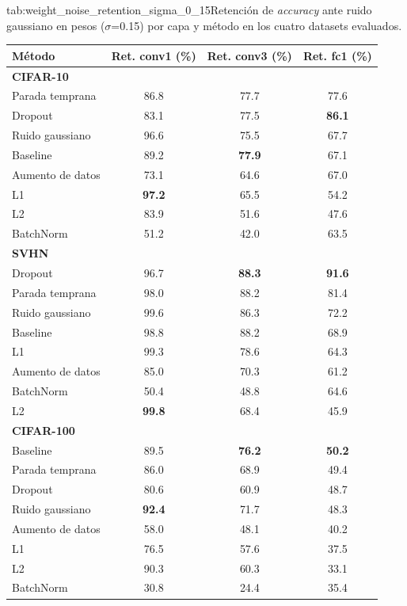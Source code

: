 \begin{table}{tab:weight_noise_retention_sigma_0_15}{Retención de \textit{accuracy} ante ruido gaussiano en pesos ($\sigma$=0.15) por capa y método en los cuatro datasets evaluados.}
\small
\begin{tabular}{lccc}
\toprule
\textbf{Método} & \textbf{Ret. conv1 (\%)} & \textbf{Ret. conv3 (\%)} & \textbf{Ret. fc1 (\%)} \\
\midrule
\multicolumn{4}{l}{\textbf{CIFAR-10}}\\
\midrule
Parada temprana & 86.8 & 77.7 & 77.6 \\
Dropout & 83.1 & 77.5 & \textbf{86.1} \\
Ruido gaussiano & 96.6 & 75.5 & 67.7 \\
Baseline & 89.2 & \textbf{77.9} & 67.1 \\
Aumento de datos & 73.1 & 64.6 & 67.0 \\
L1 & \textbf{97.2} & 65.5 & 54.2 \\
L2 & 83.9 & 51.6 & 47.6 \\
BatchNorm & 51.2 & 42.0 & 63.5 \\
\midrule
\multicolumn{4}{l}{\textbf{SVHN}}\\
\midrule
Dropout & 96.7 & \textbf{88.3} & \textbf{91.6} \\
Parada temprana & 98.0 & 88.2 & 81.4 \\
Ruido gaussiano & 99.6 & 86.3 & 72.2 \\
Baseline & 98.8 & 88.2 & 68.9 \\
L1 & 99.3 & 78.6 & 64.3 \\
Aumento de datos & 85.0 & 70.3 & 61.2 \\
BatchNorm & 50.4 & 48.8 & 64.6 \\
L2 & \textbf{99.8} & 68.4 & 45.9 \\
\midrule
\multicolumn{4}{l}{\textbf{CIFAR-100}}\\
\midrule
Baseline & 89.5 & \textbf{76.2} & \textbf{50.2} \\
Parada temprana & 86.0 & 68.9 & 49.4 \\
Dropout & 80.6 & 60.9 & 48.7 \\
Ruido gaussiano & \textbf{92.4} & 71.7 & 48.3 \\
Aumento de datos & 58.0 & 48.1 & 40.2 \\
L1 & 76.5 & 57.6 & 37.5 \\
L2 & 90.3 & 60.3 & 33.1 \\
BatchNorm & 30.8 & 24.4 & 35.4 \\
\midrule

\end{tabular}
\end{table}
